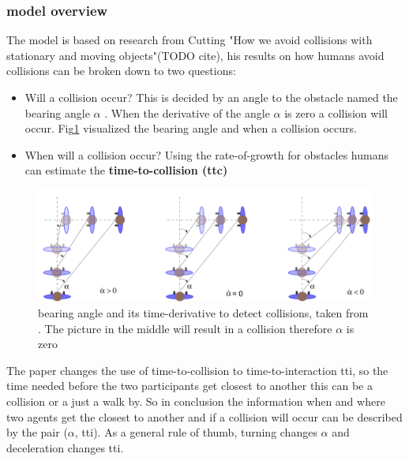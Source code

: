 \documentclass[sigconf]{acmart}
\begin{document}
\subsubsection{model overview}

The model is based on research from Cutting "How we avoid collisions with stationary and moving objects"(TODO cite), his results on how humans avoid collisions can be broken down to two questions: 
\begin{itemize}
\item Will a collision occur? This is decided by an angle to the obstacle named the bearing angle $\alpha$ . When the derivative of the angle \textbf{\.{$\alpha$}} is zero a collision will occur. Fig\ref{fig:visualBearingangle} visualized the bearing angle and when a collision occurs.
\item When will a collision occur? Using the rate-of-growth for obstacles humans can estimate the \textbf{time-to-collision (ttc)}
\end{itemize}
\begin{figure}[h]
  \centering
  \includegraphics[width=1\linewidth]{images/visualApproach-bearingAngle.png}
  \caption{bearing angle and its time-derivative to detect collisions, taken from \cite{ondrej_synthetic-vision_2010}. The picture in the middle will result in a collision therefore \.{$\alpha$} is zero}
  \label{fig:visualBearingangle}
\end{figure}
The paper changes the use of time-to-collision to time-to-interaction tti, so the time needed before the two participants get closest to another this can be a collision or a just a walk by. So in conclusion the information when and where two agents get the closest to another and if a collision will occur can be described by the pair (\.{$\alpha$}, tti). As a general rule of thumb, turning changes \.{$\alpha$} and deceleration changes tti. 
\end{document}
